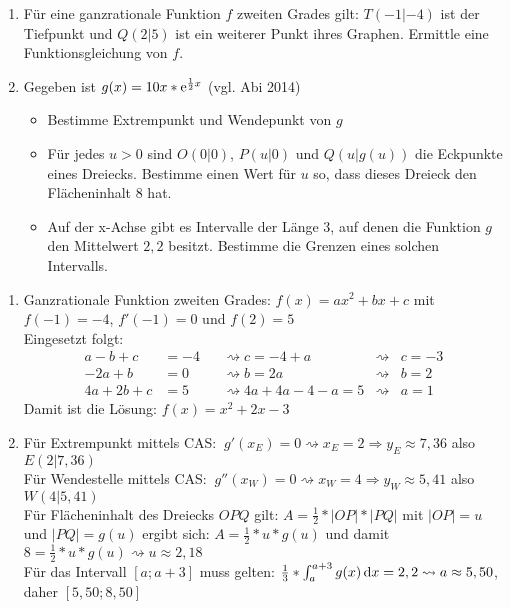 \begin{enumerate}
	\item Für eine ganzrationale Funktion $f$ zweiten Grades gilt: $T(-1|-4)$ ist der Tiefpunkt und $Q(2|5)$ ist ein weiterer Punkt ihres Graphen. Ermittle eine Funktionsgleichung von $f$.
	\item Gegeben ist $g(x)=10x*\mathrm{e}^{\frac{1}{2}x}$ (vgl. Abi 2014)\cas\begin{itemize}
		\item Bestimme Extrempunkt und Wendepunkt von $g$
		\item Für jedes $u>0$ sind $O(0|0)$, $P(u|0)$ und $Q(u|g(u))$ die Eckpunkte eines Dreiecks. Bestimme einen Wert für $u$ so, dass dieses Dreieck den Flächeninhalt $8$ hat.
		\item Auf der x-Achse gibt es Intervalle der Länge 3, auf denen die Funktion $g$ den Mittelwert $2,2$ besitzt. Bestimme die Grenzen eines solchen Intervalls.
	\end{itemize}
\end{enumerate}

\begin{lsg}{}
\begin{enumerate}
	\item Ganzrationale Funktion zweiten Grades: $f(x)=ax^2+bx+c$ mit $f(-1)=-4$, $f'(-1)=0$ und $f(2)=5$\\
	Eingesetzt folgt:\begin{align*}
		a-b+c&=-4&& \rightsquigarrow c=-4+a&\rightsquigarrow &c=-3\\
		-2a+b&=0&&\rightsquigarrow b=2a &\rightsquigarrow &b=2\\
		4a+2b+c&=5&&\rightsquigarrow 4a+4a-4-a=5&\rightsquigarrow &a=1
	\end{align*}
Damit ist die Lösung: $f(x)=x^2+2x-3$
	\item Für Extrempunkt mittels CAS: $\ g'(x_E)=0\rightsquigarrow x_E=2\Rightarrow y_E\approx 7,36$ also $E(2|7,36)$\\
	Für Wendestelle mittels CAS: $\ g''(x_W)=0 \rightsquigarrow x_W=4 \Rightarrow y_W\approx 5,41$ also $W(4|5,41)$\\
	Für Flächeninhalt des Dreiecks $OPQ$ gilt: $A=\frac{1}{2}* |OP|*|PQ|$ mit $|OP|=u$ und $|PQ|=g(u)$ ergibt sich:
	$A=\frac{1}{2}*u*g(u)$ und damit $8=\frac{1}{2}*u*g(u) \rightsquigarrow u\approx 2,18$\\
	Für das Intervall $[a;a+3]$ muss gelten: $\frac{1}{3}*\int_a^{a+3} g(x) \,\mathrm{d} x =2,2\rightsquigarrow a \approx 5,50$, daher $[5,50;8,50]$
	

\end{enumerate}
\end{lsg}



